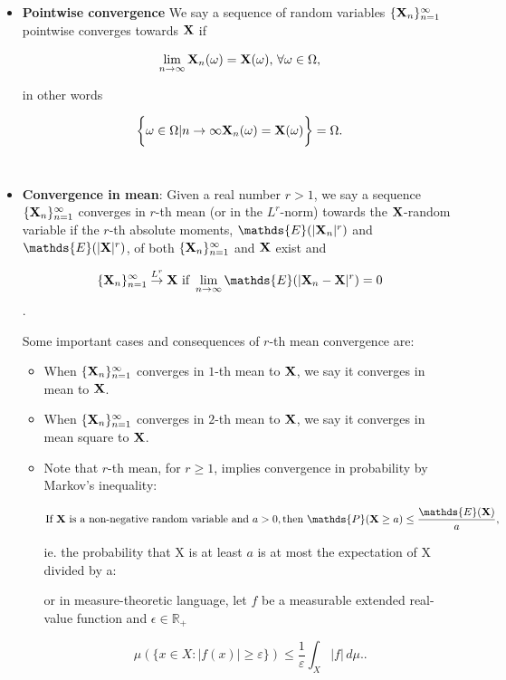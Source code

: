 \documentclass{homework}
\begin{document}
\begin{itemize}
        \item \textbf{Pointwise convergence}
        We say a sequence of random variables $\{{\bf X}_n\}_{n=1}^{\infty}$ pointwise converges towards ${\bf X}$ if 
        
        $$
        \lim_{n \rightarrow \infty} {\bf X}_n (\omega) = {\bf X}(\omega) \textnormal{, } \forall \omega \in \Omega,
        $$
        
        in other words 
        
        $$
        \bigg\{\omega \in \Omega | {n \rightarrow \infty} {\bf X}_n (\omega) = {\bf X}(\omega) \bigg\} = \Omega.
        $$\\
        
        \item \textbf{Convergence in mean}: Given a real number $r > 1$, we say a sequence $\{{\bf X}_n\}_{n=1}^{\infty}$ converges in $r$-th mean (or in the $L^r$-norm) towards the ${\bf X}$-random variable if the $r$-th absolute moments,
        $\mathds{E}(|\X_n|^r)$ and $\mathds{E}(|\X|^r)$, of both $\{{\bf X}_n\}_{n=1}^{\infty}$ and ${\bf X}$ exist and
        
        $$
        \seq \overset{L^r}{\rightarrow} \X \textnormal{ if } \lim_{n \rightarrow \infty} \mathds{E}(|\X_n - \X|^r)= 0
        $$.
        
        Some important cases and consequences of $r$-th mean convergence are:
        
        \begin{itemize}
            \item When $\{{\bf X}_n\}_{n=1}^{\infty}$ converges in $1$-th mean to ${\bf X}$, we say it converges in mean to ${\bf X}$.  \\
            \item When $\{{\bf X}_n\}_{n=1}^{\infty}$ converges in $2$-th mean to ${\bf X}$, we say it converges in mean square to ${\bf X}$.  \\
            \item Note that $r$-th mean, for $r \geq 1$, implies convergence in probability by Markov's inequality:
            
            $$
            \textnormal{If } \X \textnormal{ is a non-negative random variable and } a > 0, \textnormal{then } \mathds{P}(\X\geq a) \leq \frac{\mathds{E}(\X)}{a},
            $$
            
            ie. the probability that X is at least $a$ is at most the expectation of X divided by a:
            
            or in measure-theoretic language, let $f$ be a measurable extended real-value function and $\epsilon \in \mathds{R}_+$
            
            $$
            {\displaystyle \mu (\{x\in X:|f(x)|\geq \varepsilon \})\leq {\frac {1}{\varepsilon }}\int _{X}|f|\,d\mu .}.
            $$\\
        \end{itemize}
\end{itemize}
\end{document}

